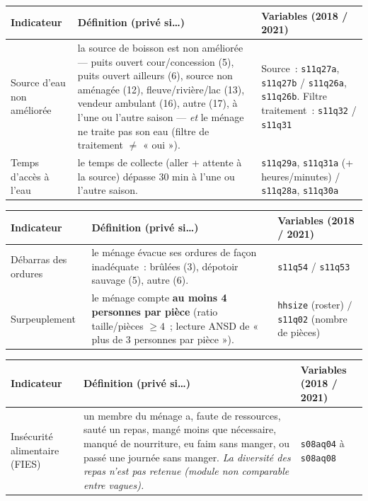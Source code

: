 \documentclass[11pt,a4paper]{article}
\newcommand{\dimtitle}[1]{\vspace{4pt}\noindent{\color{entete}\large\bfseries #1}\par\vspace{2pt}}
\begin{document}
\dimtitle{2. Eau}
\begin{tabularx}{\textwidth}{L{3.1cm} X L{3.3cm}}
\toprule
\textbf{Indicateur} & \textbf{Définition (privé si\dots)} & \textbf{Variables (2018 / 2021)} \\
\midrule
Source d'eau non améliorée & la source de boisson est non améliorée --- puits ouvert cour/concession (5), puits ouvert ailleurs (6), source non aménagée (12), fleuve/rivière/lac (13), vendeur ambulant (16), autre (17), à l'une ou l'autre saison --- \emph{et} le ménage ne traite pas son eau (filtre de traitement $\neq$ « oui »). & Source~: \texttt{s11q27a}, \texttt{s11q27b} / \texttt{s11q26a}, \texttt{s11q26b}. Filtre traitement~: \texttt{s11q32} / \texttt{s11q31} \\
Temps d'accès à l'eau & le temps de collecte (aller + attente à la source) dépasse 30 min à l'une ou l'autre saison. & \texttt{s11q29a}, \texttt{s11q31a} (+ heures/minutes) / \texttt{s11q28a}, \texttt{s11q30a} \\
\bottomrule
\end{tabularx}

\dimtitle{3. Logement}
\begin{tabularx}{\textwidth}{L{3.1cm} X L{3.3cm}}
\toprule
\textbf{Indicateur} & \textbf{Définition (privé si\dots)} & \textbf{Variables (2018 / 2021)} \\
\midrule
Débarras des ordures & le ménage évacue ses ordures de façon inadéquate~: brûlées (3), dépotoir sauvage (5), autre (6). & \texttt{s11q54} / \texttt{s11q53} \\
Surpeuplement & le ménage compte \textbf{au moins 4 personnes par pièce} (ratio taille/pièces $\geq 4$~; lecture ANSD de « plus de 3 personnes par pièce »). & \texttt{hhsize} (roster) $/$ \texttt{s11q02} (nombre de pièces) \\
\bottomrule
\end{tabularx}

\dimtitle{4. Nutrition}
\begin{tabularx}{\textwidth}{L{3.1cm} X L{3.3cm}}
\toprule
\textbf{Indicateur} & \textbf{Définition (privé si\dots)} & \textbf{Variables (2018 / 2021)} \\
\midrule
Insécurité alimentaire (FIES) & un membre du ménage a, faute de ressources, sauté un repas, mangé moins que nécessaire, manqué de nourriture, eu faim sans manger, ou passé une journée sans manger. \emph{La diversité des repas n'est pas retenue (module non comparable entre vagues).} & \texttt{s08aq04} à \texttt{s08aq08} \\
\bottomrule
\end{tabularx}
\end{document}

